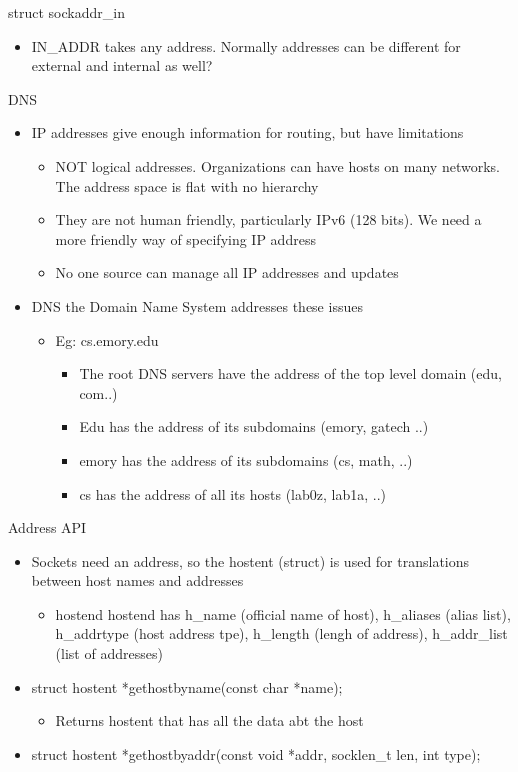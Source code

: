 struct sockaddr\_in
\begin{itemize}
    \item IN\_ADDR takes any address. Normally addresses can be different for external and internal as well?
\end{itemize}
DNS
\begin{itemize}
    \item IP addresses give enough information for routing, but have limitations
    \begin{itemize}
        \item NOT logical addresses. Organizations can have hosts on many networks. The address space is flat with no hierarchy
        \item They are not human friendly, particularly IPv6 (128 bits). We need a more friendly way of specifying IP address
        \item No one source can manage all IP addresses and updates
    \end{itemize}
    \item DNS the Domain Name System addresses these issues
    \begin{itemize}
        \item Eg: cs.emory.edu
        \begin{itemize}
            \item The root DNS servers have the address of the top level domain (edu, com..)
            \item Edu has the address of its subdomains (emory, gatech ..)
            \item emory has the address of its subdomains (cs, math, ..)
            \item cs has the address of all its hosts (lab0z, lab1a, ..)
        \end{itemize}
    \end{itemize}
\end{itemize}
Address API
\begin{itemize}
    \item Sockets need an address, so the hostent (struct) is used for translations between host names and addresses
    \begin{itemize}
        \item hostend hostend has h\_name (official name of host), h\_aliases (alias list), h\_addrtype (host address tpe), h\_length (lengh of address), h\_addr\_list (list of addresses)
    \end{itemize}
    \item struct hostent *gethostbyname(const char *name);
    \begin{itemize}
        \item Returns hostent that has all the data abt the host
    \end{itemize}
    \item struct hostent *gethostbyaddr(const void *addr, socklen\_t len, int type); 
\end{itemize}